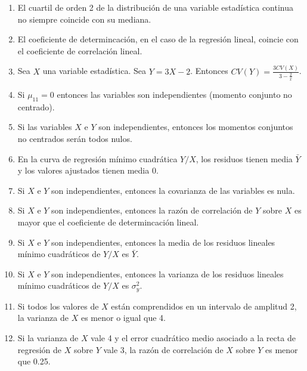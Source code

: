 \documentclass[fleqn]{article}
\begin{document}
\begin{enumerate}
                        \begin{enumerate}
                                \item El cuartil de orden 2 de la distribución de una variable estadística continua no siempre 
                                        coincide con su mediana.
                                \item El coeficiente de determincación, en el caso de la regresión lineal, coincie con el 
                                        coeficiente de correlación lineal.
                                \item Sea $X$ una variable estadística. Sea $Y = 3X - 2$. Entonces 
                                        $CV(Y) = \frac{3CV(X)}{3 - \frac{2}{\bar{x}}}$.
                                \item Si $\mu_{11} = 0$ entonces las variables son independientes (momento conjunto no centrado).
                                \item Si las variables $X$ e $Y$ son independientes, entonces los momentos conjuntos no centrados
                                        serán todos nulos.
                                \item En la curva de regresión mínimo cuadrática $Y/X$, los residuos tienen media $\bar{Y}$ y los 
                                        valores ajustados tienen media 0.
                                \item Si $X$ e $Y$ son independientes, entonces la covarianza de las variables es nula.
                                \item Si $X$ e $Y$ son independientes, entonces la razón de correlación de $Y$ sobre $X$ es mayor que
                                        el coeficiente de determincación lineal.
                                \item Si $X$ e $Y$ son independientes, entonces la media de los residuos lineales mínimo cuadráticos 
                                        de $Y/X$ es $\bar{Y}$.
                                \item Si $X$ e $Y$ son independientes, entonces la varianza de los residuos lineales mínimo cuadráticos
                                        de $Y/X$ es $\sigma_y ^2$.
                                \item Si todos los valores de $X$ están comprendidos en un intervalo de amplitud 2, la varianza de $X$ es 
                                        menor o igual que 4.
                                \item Si la varianza de $X$ vale 4 y el error cuadrático medio asociado a la recta de regresión de $X$
                                        sobre $Y$ vale 3, la razón de correlación de $X$ sobre $Y$ es menor que 0.25.
                        \end{enumerate}



\end{enumerate}
\end{document}
